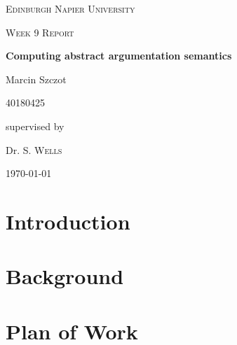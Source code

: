 \documentclass[12pt,a4paper]{report}
\theoremstyle{definition}
\begin{document}
\begin{titlepage}
	\centering
	{\scshape\LARGE Edinburgh Napier University \par}
	\vspace{1cm}
	{\scshape\Large Week 9 Report\par}
	\vspace{1.5cm}
	{\huge\bfseries Computing abstract argumentation semantics\par}
	\vspace{2cm}
	{\Large Marcin Szczot\par}
	{\Large 40180425\par}
	\vfill
	supervised by\par
	Dr. S. \textsc{Wells}

	\vfill

	{\large \today\par}
\end{titlepage}

\tableofcontents %
\newpage

\listoftables
\listoffigures
\newpage


\newcommand{\software}{\textit{Alias}}

\chapter{Introduction}


\chapter{Background}
 

\chapter{Plan of Work}

\end{document}
